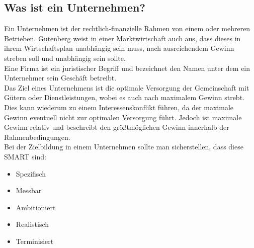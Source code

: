 \documentclass{article}
\begin{document}
	\subsection{Was ist ein Unternehmen?}
	Ein Unternehmen ist der rechtlich-finanzielle Rahmen von einem oder mehreren Betrieben. Gutenberg weist in einer Marktwirtschaft auch aus, dass dieses in ihrem Wirtschaftsplan unabhängig sein muss, nach ausreichendem Gewinn streben soll und unabhängig sein sollte. \\
	Eine Firma ist ein juristischer Begriff und bezeichnet den Namen unter dem ein Unternehmer sein Geschäft betreibt. \\
	Das Ziel eines Unternehmens ist die optimale Versorgung der Gemeinschaft mit Gütern oder Dienstleistungen, wobei es auch nach maximalem Gewinn strebt. Dies kann wiederum zu einem Interessenskonflikt führen, da der maximale Gewinn eventuell nicht zur optimalen Versorgung führt. Jedoch ist maximale Gewinn relativ und beschreibt den größtmöglichen Gewinn innerhalb der Rahmenbedingungen. \\
	Bei der Zielbildung in einem Unternehmen sollte man sicherstellen, dass diese SMART sind:
	\begin{itemize}
		\item{Spezifisch}
		\item{Messbar}
		\item{Ambitioniert}
		\item{Realistisch}
		\item{Terminisiert}
	\end{itemize}
\end{document}
